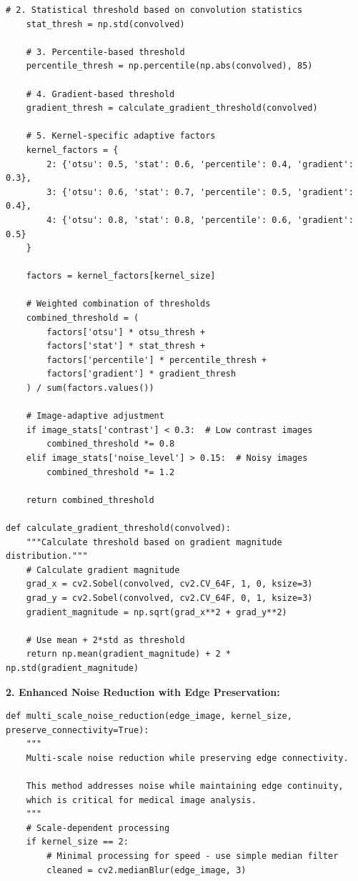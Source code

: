 \documentclass[conference]{IEEEtran}
\begin{document}
{{{{{{{{{{\begin{lstlisting}[caption={Advanced adaptive thresholding solution with multi-modal analysis}]
    # 2. Statistical threshold based on convolution statistics
    stat_thresh = np.std(convolved)
    
    # 3. Percentile-based threshold
    percentile_thresh = np.percentile(np.abs(convolved), 85)
    
    # 4. Gradient-based threshold
    gradient_thresh = calculate_gradient_threshold(convolved)
    
    # 5. Kernel-specific adaptive factors
    kernel_factors = {
        2: {'otsu': 0.5, 'stat': 0.6, 'percentile': 0.4, 'gradient': 0.3},
        3: {'otsu': 0.6, 'stat': 0.7, 'percentile': 0.5, 'gradient': 0.4},
        4: {'otsu': 0.8, 'stat': 0.8, 'percentile': 0.6, 'gradient': 0.5}
    }
    
    factors = kernel_factors[kernel_size]
    
    # Weighted combination of thresholds
    combined_threshold = (
        factors['otsu'] * otsu_thresh +
        factors['stat'] * stat_thresh +
        factors['percentile'] * percentile_thresh +
        factors['gradient'] * gradient_thresh
    ) / sum(factors.values())
    
    # Image-adaptive adjustment
    if image_stats['contrast'] < 0.3:  # Low contrast images
        combined_threshold *= 0.8
    elif image_stats['noise_level'] > 0.15:  # Noisy images
        combined_threshold *= 1.2
    
    return combined_threshold

def calculate_gradient_threshold(convolved):
    """Calculate threshold based on gradient magnitude distribution."""
    # Calculate gradient magnitude
    grad_x = cv2.Sobel(convolved, cv2.CV_64F, 1, 0, ksize=3)
    grad_y = cv2.Sobel(convolved, cv2.CV_64F, 0, 1, ksize=3)
    gradient_magnitude = np.sqrt(grad_x**2 + grad_y**2)
    
    # Use mean + 2*std as threshold
    return np.mean(gradient_magnitude) + 2 * np.std(gradient_magnitude)
\end{lstlisting}

\textbf{2. Enhanced Noise Reduction with Edge Preservation:}
\begin{lstlisting}[caption={Multi-scale noise reduction with edge preservation}]
def multi_scale_noise_reduction(edge_image, kernel_size, preserve_connectivity=True):
    """
    Multi-scale noise reduction while preserving edge connectivity.
    
    This method addresses noise while maintaining edge continuity,
    which is critical for medical image analysis.
    """
    # Scale-dependent processing
    if kernel_size == 2:
        # Minimal processing for speed - use simple median filter
        cleaned = cv2.medianBlur(edge_image, 3)
        

\end{lstlisting}}}}}}}}}}}
\end{document}
